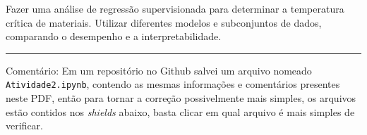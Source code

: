 Fazer uma análise de regressão supervisionada para determinar a temperatura crítica de materiais. Utilizar diferentes modelos e subconjuntos de dados, comparando o desempenho e a interpretabilidade.

\rule{\linewidth}{1pt}

Comentário: Em um repositório no Github salvei um arquivo nomeado \verb|Atividade2.ipynb|, contendo as mesmas informações e comentários presentes neste PDF, então para tornar a correção possivelmente mais simples, os arquivos estão contidos nos \textit{shields} abaixo, basta clicar em qual arquivo é mais simples de verificar.

\begin{center}
\end{center}